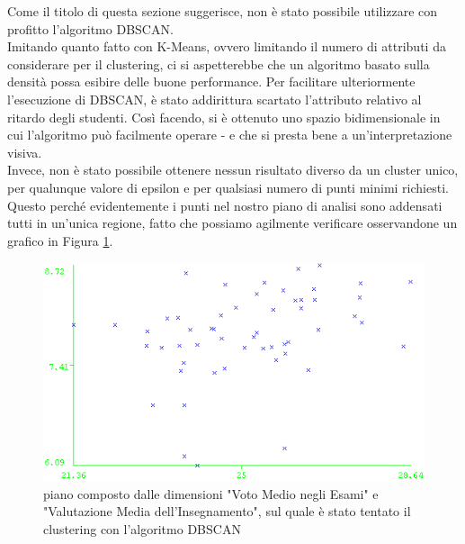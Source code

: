     Come il titolo di questa sezione suggerisce, non è stato possibile utilizzare con profitto l'algoritmo DBSCAN. \\

    Imitando quanto fatto con K-Means, ovvero limitando il numero di attributi da considerare per il clustering, ci si aspetterebbe che un algoritmo basato sulla densità possa esibire delle buone performance. Per facilitare ulteriormente l'esecuzione di DBSCAN, è stato addirittura scartato l'attributo relativo al ritardo degli studenti. Così facendo, si è ottenuto uno spazio bidimensionale in cui l'algoritmo può facilmente operare - e che si presta bene a un'interpretazione visiva. \\

    Invece, non è stato possibile ottenere nessun risultato diverso da un cluster unico, per qualunque valore di epsilon e per qualsiasi numero di punti minimi richiesti. Questo perché evidentemente i punti nel nostro piano di analisi sono addensati tutti in un'unica regione, fatto che possiamo agilmente verificare osservandone un grafico in Figura \ref{dbscan}.

    \begin{figure}
        \centering
        \caption{piano composto dalle dimensioni "Voto Medio negli Esami" e "Valutazione Media dell'Insegnamento", sul quale è stato tentato il clustering con l'algoritmo DBSCAN}
        \label{dbscan}
        \includegraphics[scale=0.80]{../cluster/dbscan.png}
    \end{figure}